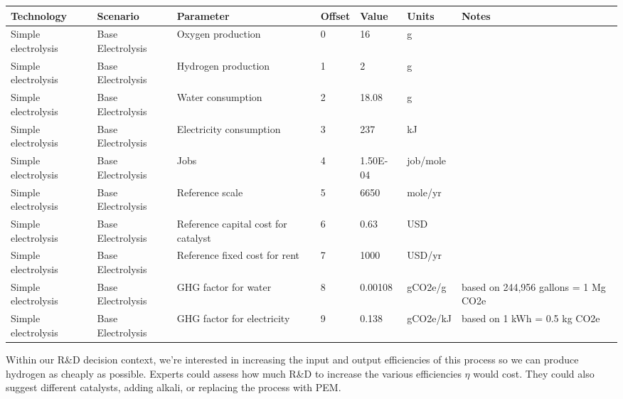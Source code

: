 \documentclass[letterpaper,10pt,english]{sphinxmanual}
\begin{document}
\begin{savenotes}\sphinxattablestart
\centering
{}
\sphinxthecaptionisattop
{}\label{\detokenize{example-technology:table-2}}\label{\detokenize{example-technology:tbl-electrolysisparams}}
\sphinxaftertopcaption
\begin{tabulary}{\linewidth}[t]{|T|T|T|T|T|T|T|}
\hline
\sphinxstyletheadfamily 
Technology
&\sphinxstyletheadfamily 
Scenario
&\sphinxstyletheadfamily 
Parameter
&\sphinxstyletheadfamily 
Offset
&\sphinxstyletheadfamily 
Value
&\sphinxstyletheadfamily 
Units
&\sphinxstyletheadfamily 
Notes
\\
\hline
Simple electrolysis
&
Base Electrolysis
&
Oxygen production
&
0
&
16
&
g
&\\
\hline
Simple electrolysis
&
Base Electrolysis
&
Hydrogen production
&
1
&
2
&
g
&\\
\hline
Simple electrolysis
&
Base Electrolysis
&
Water consumption
&
2
&
18.08
&
g
&\\
\hline
Simple electrolysis
&
Base Electrolysis
&
Electricity consumption
&
3
&
237
&
kJ
&\\
\hline
Simple electrolysis
&
Base Electrolysis
&
Jobs
&
4
&
1.50E-04
&
job/mole
&\\
\hline
Simple electrolysis
&
Base Electrolysis
&
Reference scale
&
5
&
6650
&
mole/yr
&\\
\hline
Simple electrolysis
&
Base Electrolysis
&
Reference capital cost for catalyst
&
6
&
0.63
&
USD
&\\
\hline
Simple electrolysis
&
Base Electrolysis
&
Reference fixed cost for rent
&
7
&
1000
&
USD/yr
&\\
\hline
Simple electrolysis
&
Base Electrolysis
&
GHG factor for water
&
8
&
0.00108
&
gCO2e/g
&
based on 244,956 gallons = 1 Mg CO2e
\\
\hline
Simple electrolysis
&
Base Electrolysis
&
GHG factor for electricity
&
9
&
0.138
&
gCO2e/kJ
&
based on 1 kWh = 0.5 kg CO2e
\\
\hline
\end{tabulary}
\par
\sphinxattableend\end{savenotes}

Within our R\&D decision context, we’re interested in increasing the input and output efficiencies of this process so we can produce hydrogen as cheaply as possible. Experts could assess how much R\&D to increase the various efficiencies \(\eta\) would cost. They could also suggest different catalysts, adding alkali, or replacing the process with PEM.
\end{document}
